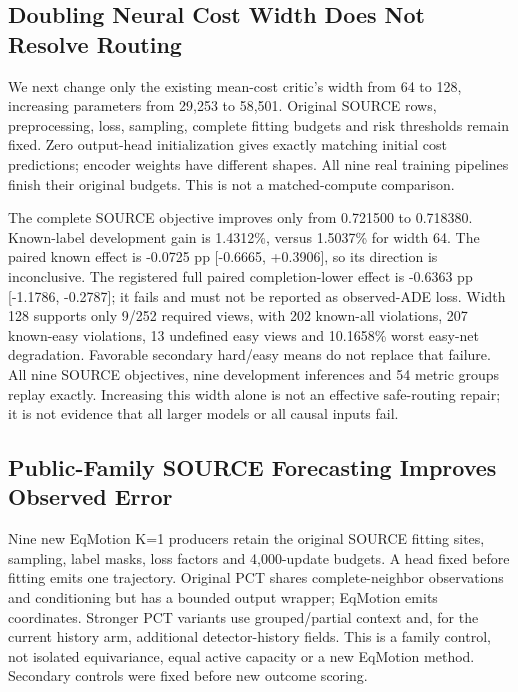 \documentclass[10pt,twocolumn,letterpaper]{article}
\begin{document}
\subsection{Doubling Neural Cost Width Does Not Resolve Routing}
We next change only the existing mean-cost critic's width from 64 to 128,
increasing parameters from 29,253 to 58,501. Original SOURCE rows, preprocessing,
loss, sampling, complete fitting budgets and risk thresholds remain fixed.
Zero output-head initialization gives exactly matching initial cost predictions;
encoder weights have different shapes. All nine real training pipelines finish
their original budgets. This is not a matched-compute comparison.

The complete SOURCE objective improves only from 0.721500 to 0.718380.
Known-label development gain is 1.4312\%, versus 1.5037\% for width 64. The paired
known effect is -0.0725 pp [-0.6665, +0.3906], so its direction is inconclusive.
The registered full paired completion-lower effect is -0.6363 pp
[-1.1786, -0.2787]; it fails and must not be reported as observed-ADE loss.
Width 128 supports only 9/252 required views, with 202 known-all violations,
207 known-easy violations, 13 undefined easy views and 10.1658\% worst easy-net
degradation. Favorable secondary hard/easy means do not replace that failure.
All nine SOURCE objectives, nine development inferences and 54 metric groups
replay exactly. Increasing this width alone is not an effective safe-routing
repair; it is not evidence that all larger models or all causal inputs fail.

\subsection{Public-Family SOURCE Forecasting Improves Observed Error}
Nine new EqMotion K=1 producers retain the original SOURCE fitting sites,
sampling, label masks, loss factors and 4,000-update budgets. A head fixed
before fitting emits one trajectory. Original PCT shares complete-neighbor
observations and conditioning but has a bounded output wrapper; EqMotion
emits coordinates. Stronger PCT variants use grouped/partial context and,
for the current history arm, additional detector-history fields. This is a
family control, not isolated equivariance, equal active capacity or a new
EqMotion method. Secondary controls were fixed before new outcome scoring.
\end{document}
